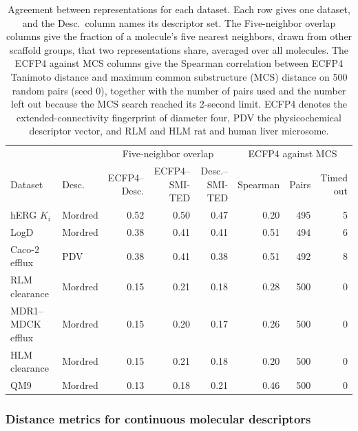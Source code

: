 \begin{table}[t]
\centering
\small
\setlength{\tabcolsep}{4pt}
\caption[Agreement between representations per dataset.]{Agreement between representations for each dataset. Each row gives one dataset, and the Desc.\ column names its descriptor set. The Five-neighbor overlap columns give the fraction of a molecule's five nearest neighbors, drawn from other scaffold groups, that two representations share, averaged over all molecules. The ECFP4 against MCS columns give the Spearman correlation between ECFP4 Tanimoto distance and maximum common substructure (MCS) distance on 500 random pairs (seed 0), together with the number of pairs used and the number left out because the MCS search reached its 2-second limit. ECFP4 denotes the extended-connectivity fingerprint of diameter four, PDV the physicochemical descriptor vector, and RLM and HLM rat and human liver microsome.}
\label{tab:flaws:neighbor_overlap}
\begin{adjustbox}{max width=\textwidth}
\begin{tabular}{llrrrrrr}
\toprule
 & & \multicolumn{3}{c}{Five-neighbor overlap} & \multicolumn{3}{c}{ECFP4 against MCS} \\
\cmidrule(lr){3-5}\cmidrule(lr){6-8}
Dataset & Desc. & \makecell{ECFP4--\\Desc.} & \makecell{ECFP4--\\SMI-TED} & \makecell{Desc.--\\SMI-TED} & Spearman & Pairs & \makecell{Timed\\out} \\
\midrule
hERG $K_i$ & Mordred & 0.52 & 0.50 & 0.47 & 0.20 & 495 & 5 \\
LogD & Mordred & 0.38 & 0.41 & 0.41 & 0.51 & 494 & 6 \\
Caco-2 efflux & PDV & 0.38 & 0.41 & 0.38 & 0.51 & 492 & 8 \\
RLM clearance & Mordred & 0.15 & 0.21 & 0.18 & 0.28 & 500 & 0 \\
MDR1--MDCK efflux & Mordred & 0.15 & 0.20 & 0.17 & 0.26 & 500 & 0 \\
HLM clearance & Mordred & 0.15 & 0.21 & 0.18 & 0.20 & 500 & 0 \\
QM9 & Mordred & 0.13 & 0.18 & 0.21 & 0.46 & 500 & 0 \\
\bottomrule
\end{tabular}
\end{adjustbox}
\end{table}


\subsubsection{Distance metrics for continuous molecular descriptors}

